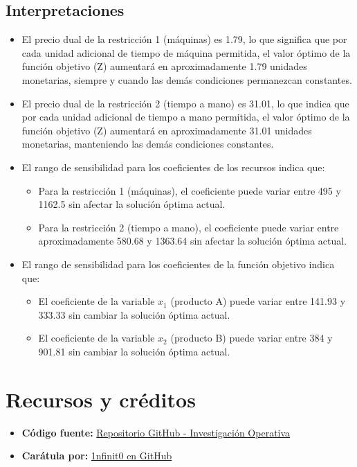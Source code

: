 \documentclass[12pt]{article}
\begin{document}
\subsection*{Interpretaciones}
\begin{itemize}
  \item El precio dual de la restricción 1 (máquinas) es 1.79, lo que significa que por cada unidad adicional de 
  tiempo de máquina permitida, el valor óptimo de la función objetivo (Z) aumentará en aproximadamente 1.79 unidades 
  monetarias, siempre y cuando las demás condiciones permanezcan constantes.
  \item El precio dual de la restricción 2 (tiempo a mano) es 31.01, lo que indica que por cada unidad adicional de tiempo
  a mano permitida, el valor óptimo de la función objetivo (Z) aumentará en aproximadamente 31.01 unidades monetarias,
  manteniendo las demás condiciones constantes.
  \item El rango de sensibilidad para los coeficientes de los recursos indica que:
    \begin{itemize}
      \item Para la restricción 1 (máquinas), el coeficiente puede variar entre 495 y 1162.5 sin afectar la solución óptima actual.
      \item Para la restricción 2 (tiempo a mano), el coeficiente puede variar entre aproximadamente 580.68 y 1363.64 sin afectar la solución óptima actual.
    \end{itemize}
  \item El rango de sensibilidad para los coeficientes de la función objetivo indica que:
    \begin{itemize}
      \item El coeficiente de la variable \(x_1\) (producto A) puede variar entre 141.93 y 333.33 sin cambiar la solución óptima actual.
      \item El coeficiente de la variable \(x_2\) (producto B) puede variar entre 384 y 901.81 sin cambiar la solución óptima actual.
    \end{itemize}
\end{itemize}

\newpage
\section*{Recursos y créditos}

\begin{itemize}
    \item \textbf{Código fuente:} \href{https://github.com/MateoTVara/UTP/tree/main/docs/C8/Investigacion_Operativa/S08-Evaluacion}{Repositorio GitHub - Investigación Operativa}
    \item \textbf{Carátula por:} \href{https://github.com/1nfinit0}{1nfinit0 en GitHub}
\end{itemize}
\end{document}

